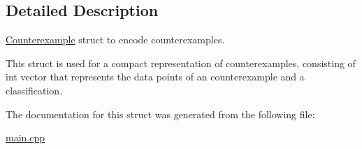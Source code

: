 \subsection{Detailed Description}
\hyperlink{structCounterexample}{Counterexample} struct to encode counterexamples. 

This struct is used for a compact representation of counterexamples, consisting of int vector that represents the data points of an counterexample and a classification. 

The documentation for this struct was generated from the following file\+:\begin{DoxyCompactItemize}
\item 
\hyperlink{main_8cpp}{main.\+cpp}\end{DoxyCompactItemize}
